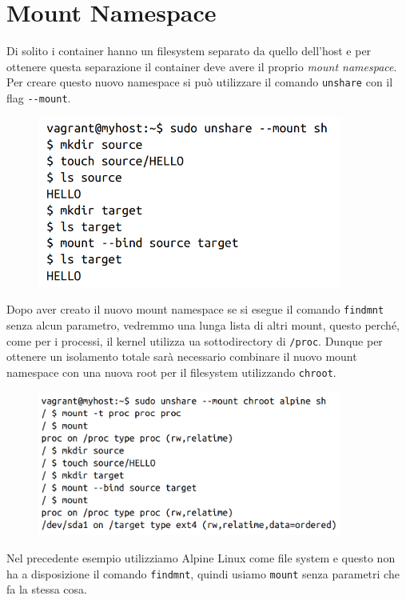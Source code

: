 \section{Mount Namespace}

Di solito i container hanno un filesystem separato da quello dell'host e per
ottenere questa separazione il container deve avere il proprio
\textit{mount namespace}. Per creare questo nuovo namespace si può utilizzare
il comando \verb|unshare| con il flag \verb|--mount|.

\begin{figure}[H]
    \centering
    \includegraphics[width=10cm, keepaspectratio]{capitoli/os_security/imgs/mount1.png}
\end{figure}

Dopo aver creato il nuovo mount namespace se si esegue il comando \verb|findmnt|
senza alcun parametro, vedremmo una lunga lista di altri mount, questo perché,
come per i processi, il kernel utilizza ua sottodirectory di \verb|/proc|.
Dunque per ottenere un isolamento totale sarà necessario combinare il nuovo mount
namespace con una nuova root per il filesystem utilizzando \verb|chroot|.

\begin{figure}[H]
    \centering
    \includegraphics[width=10cm, keepaspectratio]{capitoli/os_security/imgs/mount2.png}
\end{figure}

Nel precedente esempio utilizziamo Alpine Linux come file system e questo non
ha a disposizione il comando \verb|findmnt|, quindi usiamo \verb|mount| senza
parametri che fa la stessa cosa.\\

